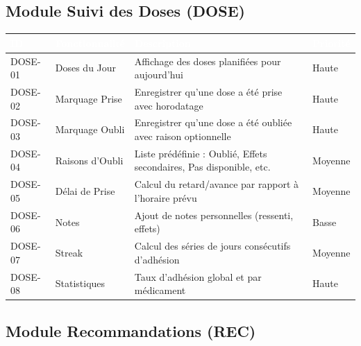 \documentclass[12pt,a4paper]{report}
\begin{document}
\subsection{Module Suivi des Doses (DOSE)}

\begin{longtable}{|p{2cm}|p{4cm}|p{7cm}|p{1.5cm}|}
    \hline
    \rowcolor{emsiblue}\textcolor{white}{\textbf{ID}} & \textcolor{white}{\textbf{Fonctionnalité}} & \textcolor{white}{\textbf{Description}} & \textcolor{white}{\textbf{Priorité}} \\
    \hline
    
    DOSE-01 & Doses du Jour & Affichage des doses planifiées pour aujourd'hui & Haute \\
    \hline
    DOSE-02 & Marquage Prise & Enregistrer qu'une dose a été prise avec horodatage & Haute \\
    \hline
    DOSE-03 & Marquage Oubli & Enregistrer qu'une dose a été oubliée avec raison optionnelle & Haute \\
    \hline
    DOSE-04 & Raisons d'Oubli & Liste prédéfinie : Oublié, Effets secondaires, Pas disponible, etc. & Moyenne \\
    \hline
    DOSE-05 & Délai de Prise & Calcul du retard/avance par rapport à l'horaire prévu & Moyenne \\
    \hline
    DOSE-06 & Notes & Ajout de notes personnelles (ressenti, effets) & Basse \\
    \hline
    DOSE-07 & Streak & Calcul des séries de jours consécutifs d'adhésion & Moyenne \\
    \hline
    DOSE-08 & Statistiques & Taux d'adhésion global et par médicament & Haute \\
    \hline
\end{longtable}

\subsection{Module Recommandations (REC)}
\end{document}
